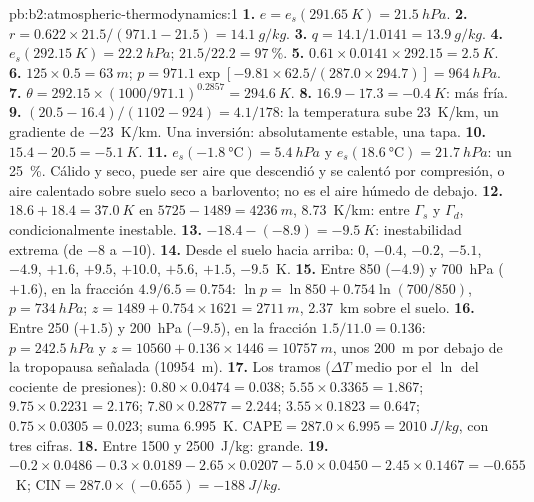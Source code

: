 \begin{solution}{pb:b2:atmospheric-thermodynamics:1}
\textbf{1.} $e = e_s(\qty{291.65}{K}) = \qty{21.5}{hPa}$.
\textbf{2.} $r = 0.622 \times 21.5/(971.1 - 21.5) = \qty{14.1}{g/kg}$.
\textbf{3.} $q = 14.1/1.0141 = \qty{13.9}{g/kg}$.
\textbf{4.} $e_s(\qty{292.15}{K}) = \qty{22.2}{hPa}$; $21.5/22.2 = \qty{97}{\percent}$.
\textbf{5.} $0.61 \times 0.0141 \times 292.15 = \qty{2.5}{K}$.
\textbf{6.} $125 \times 0.5 = \qty{63}{m}$; $p = 971.1 \exp[-9.81 \times 62.5/(287.0 \times 294.7)]
= \qty{964}{hPa}$.
\textbf{7.} $\theta = 292.15 \times (1000/971.1)^{0.2857} = \qty{294.6}{K}$.
\textbf{8.} $16.9 - 17.3 = \qty{-0.4}{K}$: más fría.
\textbf{9.} $(20.5 - 16.4)/(1102 - 924) = 4.1/178$: la temperatura sube \qty{23}{K/km}, un
gradiente de \qty{-23}{K/km}. Una inversión: absolutamente estable, una tapa.
\textbf{10.} $15.4 - 20.5 = \qty{-5.1}{K}$.
\textbf{11.} $e_s(\qty{-1.8}{\celsius}) = \qty{5.4}{hPa}$ y $e_s(\qty{18.6}{\celsius}) =
\qty{21.7}{hPa}$: un \qty{25}{\percent}. Cálido y seco, puede ser aire que descendió y se calentó por
compresión, o aire calentado sobre suelo seco a barlovento; no es el aire húmedo de debajo.
\textbf{12.} $18.6 + 18.4 = \qty{37.0}{K}$ en $5725 - 1489 = \qty{4236}{m}$, \qty{8.73}{K/km}: entre $\Gamma_s$ y
$\Gamma_d$, condicionalmente inestable.
\textbf{13.} $-18.4 - (-8.9) = \qty{-9.5}{K}$: inestabilidad extrema (de $-8$ a $-10$).
\textbf{14.} Desde el suelo hacia arriba: 0, $-0.4$, $-0.2$, $-5.1$, $-4.9$, $+1.6$, $+9.5$, $+10.0$,
$+5.6$, $+1.5$, $-9.5$~\unit{K}.
\textbf{15.} Entre 850 ($-4.9$) y \qty{700}{hPa} ($+1.6$), en la fracción $4.9/6.5 = 0.754$:
$\ln p = \ln 850 + 0.754 \ln(700/850)$, $p = \qty{734}{hPa}$; $z = 1489 + 0.754 \times 1621 =
\qty{2711}{m}$, \qty{2.37}{km} sobre el suelo.
\textbf{16.} Entre 250 ($+1.5$) y \qty{200}{hPa} ($-9.5$), en la fracción $1.5/11.0 =
0.136$: $p = \qty{242.5}{hPa}$ y $z = 10560 + 0.136 \times 1446 = \qty{10757}{m}$, unos
\qty{200}{m} por debajo de la tropopausa señalada (\qty{10954}{m}).
\textbf{17.} Los tramos ($\Delta T$ medio por el $\ln$ del cociente de presiones): $0.80 \times 0.0474
= 0.038$; $5.55 \times 0.3365 = 1.867$; $9.75 \times 0.2231 = 2.176$; $7.80 \times 0.2877 =
2.244$; $3.55 \times 0.1823 = 0.647$; $0.75 \times 0.0305 = 0.023$; suma \qty{6.995}{K}.
$\text{CAPE} = 287.0 \times 6.995 = \qty{2010}{J/kg}$, con tres cifras.
\textbf{18.} Entre 1500 y \qty{2500}{J/kg}: grande.
\textbf{19.} $-0.2 \times 0.0486 - 0.3 \times 0.0189 - 2.65 \times 0.0207 - 5.0 \times 0.0450 -
2.45 \times 0.1467 = -0.655$~\unit{K}; $\text{CIN} = 287.0 \times (-0.655) = \qty{-188}{J/kg}$.

\end{solution}

